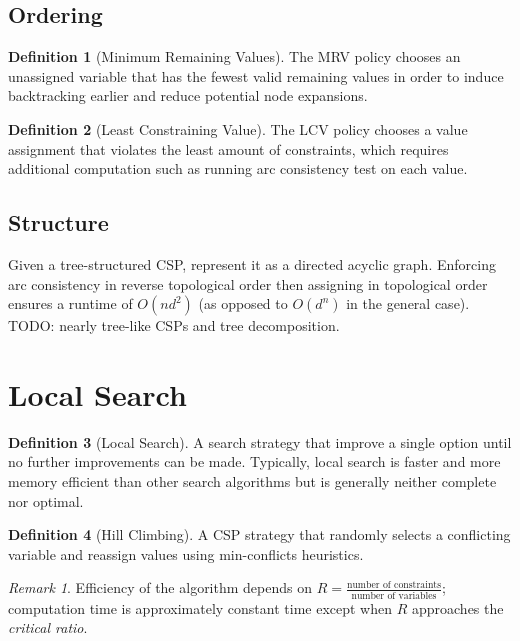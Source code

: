 \documentclass[11pt]{article}
\theoremstyle{definition}
\newtheorem{definition}{Definition}[section]
\theoremstyle{remark}
\newtheorem*{remark}{Remark}
\begin{document}
\subsection{Ordering}
\begin{definition}[Minimum Remaining Values]
The MRV policy chooses an unassigned variable that has the fewest valid remaining values in order to induce backtracking earlier and reduce potential node expansions.
\end{definition}

\begin{definition}[Least Constraining Value]
The LCV policy chooses a value assignment that violates the least amount of constraints, which requires additional computation such as running arc consistency test on each value.
\end{definition}

\subsection{Structure}
Given a tree-structured CSP, represent it as a directed acyclic graph. Enforcing arc consistency in reverse topological order then assigning in topological order ensures a runtime of $O(nd^2)$  (as opposed to $O(d^n)$ in the general case). \\
TODO: nearly tree-like CSPs and tree decomposition.
\clearpage

\section{Local Search}
\begin{definition}[Local Search]
A search strategy that improve a single option until no further improvements can be made. Typically, local search is faster and more memory efficient than other search algorithms but is generally neither complete nor optimal.
\end{definition}

\begin{definition}[Hill Climbing]
A CSP strategy that randomly selects a conflicting variable and reassign values using min-conflicts heuristics.
\end{definition}

\begin{remark}
Efficiency of the algorithm depends on $R=\tfrac{\text{number of constraints}}{\text{number of variables}}$; computation time is approximately constant time except when $R$ approaches the \textit{critical ratio}.
\end{remark}
\end{document}
